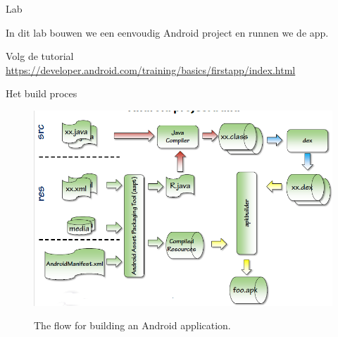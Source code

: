 \documentclass{beamer}
\begin{document}
\begin{frame}{Lab}

	In dit lab bouwen we een eenvoudig Android project en runnen we de app.
	

		Volg de tutorial \url{https://developer.android.com/training/basics/firstapp/index.html}

	

\end{frame}
\begin{frame}[fragile]{Het build proces}

	\begin{figure}[hb]
		\includegraphics[width=\textwidth]{img/hello/buildproces.png}
		\label{fig:develop}
		\caption{The flow for building an Android application. }
	\end{figure}

\end{frame}
\end{document}
